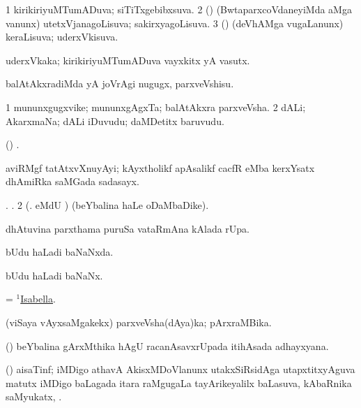 \bentry
{}
\gl{\gu}
\bmng
\bnum
\num{1} kirikiriyuMTumADuva; siTiTxgebibxsuva. 
\num{2} (\jiVvi) (BwtaparxcoVdaneyiMda aMga \mo vanunx) utetxVjanagoLisuva; sakirxyagoLisuva. 
\num{3} (\shavi) (deVhAMga \mo vugaLanunx) keraLisuva; uderxVkisuva. 
\enum
\emng
\eentry

\bentry
{}
\gl{\nA}
\bmng
uderxVkaka; kirikiriyuMTumADuva vayxkitx yA vasutx. 
\emng
\eentry

\bentry
{}
\gl{\akirx}
\bmng
balAtAkxradiMda yA joVrAgi nugugx, parxveVshisu. 
\emng
\eentry

\bentry
{}
\gl{\nA}
\bmng
\bnum
\num{1} mununxgugxvike; mununxgAgxTa; balAtAkxra parxveVsha. 
\num{2} dALi; AkarxmaNa; dALi iDuvudu; daMDetitx baruvudu. 
\enum
\emng
\eentry

\bentry
{}
\gl{\saMkiSx}
\bmng
(\ame) . 
\emng
\eentry

\bentry
{}
\gl{\nA}
\bmng
aviRMgf tatAtxvXnuyAyi; kAyxtholikf apAsalikf cacfR eMba kerxYsatx dhAmiRka saMGada sadasayx. 
\emng
\eentry

\bentry
{}
\gl{\saMkiSx}
\bmng
\bnum
{} 
\banum
{} . 
 . 
\eanum
\numie
\num{2} (. eMdU \parx)  (beYbalina haLe oDaMbaDike). 
\enum
\emng
\eentry

\bentry
{}
\gl{\kirx}
\bmng
{} dhAtuvina parxthama puruSa vataRmAna kAlada rUpa. 
\emng
\eentry

\bentry
{}
\gl{\gu}
\bmng
bUdu haLadi baNaNxda. 
\emng
\eentry

\bentry
{}
\gl{\nA}
\bmng
bUdu haLadi baNaNx. 
\emng
\eentry

\bentry
{}
\gl{\gu}
\bmng
= \hyperlink{Isabella(1)}{$^1$Isabella}. 
\emng
\eentry

\bentry
{}
\gl{\gu}
\bmng
(viSaya vAyxsaMgakekx) parxveVsha(dAya)ka; pArxraMBika. 
\emng
\eentry

\bentry
{}
\gl{\nA}
\bmng
(\bava) beYbalina gArxMthika hAgU racanAsavxrUpada itihAsada adhayxyana. 
\emng
\eentry

\bentry
{}
\gl{\nA}
\bmng
(\ravi) aisaTinf; iMDigo athavA AkisxMDoVlanunx utakxSiRsidAga utapxtitxyAguva matutx iMDigo baLagada itara raMgugaLa tayArikeyalilx baLasuva, kAbaRnika saMyukatx, . 
\emng
\eentry


